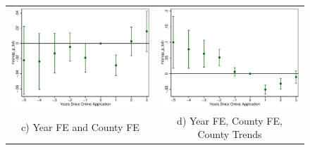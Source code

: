 \documentclass[11pt,letterpaper]{article}
\begin{document}
\begin{figure}
\begin{tabular}{cc}
\includegraphics[scale=0.57]{tabfig/evstu_snap_p_tot_total_pop_yrcf_5_3}&\includegraphics[scale=0.57]{tabfig/evstu_snap_p_tot_total_pop_yrcfsttr_5_3}\\
c) Year FE and County FE&d) Year FE, County FE, County Trends\\
\end{tabular}
\end{figure}
\end{document}
